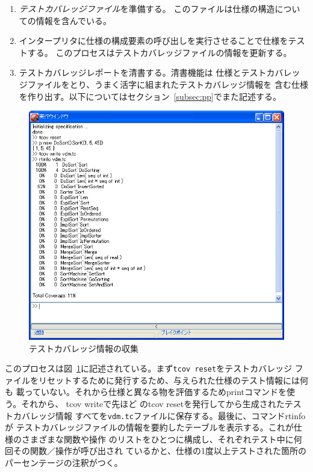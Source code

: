 \documentclass[\pformat,12pt]{jarticle}
\newcommand{\guicmd}[1]{{\gt #1}}
\begin{document}
\begin{enumerate}

\item
{\em テストカバレッジファイル}を準備する。
このファイルは仕様の構造についての情報を含んでいる。

\item
インタープリタに仕様の構成要素の呼び出しを実行させることで仕様をテストする。
このプロセスはテストカバレッジファイルの情報を更新する。

\item
テストカバレッジレポートを清書する。清書機能は
仕様とテストカバレッジファイルをとり、うまく活字に組まれたテストカバレッジ情報を
含む仕様を作り出す。以下についてはセクション~\ref{subsec:pp}でまた記述する。
\end{enumerate}

\begin{figure}[tbh]
\begin{center}
\includegraphics[width=12.5cm]{testCov-pp.png}
\caption{テストカバレッジ情報の収集}
\label{fig:guitcov}
\end{center}
\end{figure}


このプロセスは図~\ref{fig:guitcov}に記述されている。まず{\tt tcov reset}をテストカバレッジ
ファイルをリセットするために発行するため、与えられた仕様のテスト情報には何も
載っていない。それから仕様と異なる物を評価するため\guicmd{print}コマンドを使う。それから、
\guicmd{tcov write}で先ほど
の\guicmd{tcov reset}を発行してから生成されたテストカバレッジ情報
すべてを\texttt{vdm.tc}ファイルに保存する。最後に、コマンド\guicmd{rtinfo} が
テストカバレッジファイルの情報を要約したテーブルを表示する。これが仕様のさまざまな関数や操作
のリストをひとつに構成し、それぞれテスト中に何回その関数／操作が呼び出され
ているかと、仕様の1度以上テストされた箇所のパーセンテージの注釈がつく。
\end{document}
